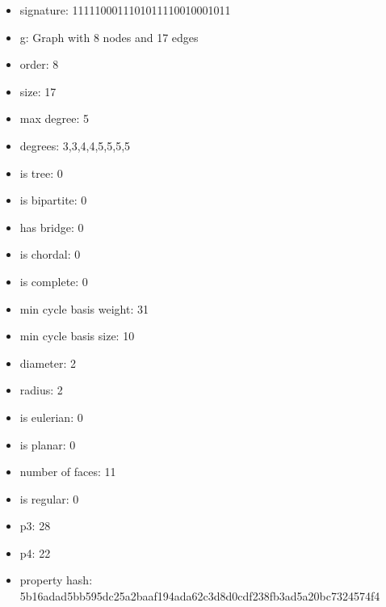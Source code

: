 \begin{itemize}
\item signature: 1111100011101011110010001011
\item g: Graph with 8 nodes and 17 edges
\item order: 8
\item size: 17
\item max degree: 5
\item degrees: 3,3,4,4,5,5,5,5
\item is tree: 0
\item is bipartite: 0
\item has bridge: 0
\item is chordal: 0
\item is complete: 0
\item min cycle basis weight: 31
\item min cycle basis size: 10
\item diameter: 2
\item radius: 2
\item is eulerian: 0
\item is planar: 0
\item number of faces: 11
\item is regular: 0
\item p3: 28
\item p4: 22
\item property hash: 5b16adad5bb595dc25a2baaf194ada62c3d8d0cdf238fb3ad5a20bc7324574f4
\end{itemize}
\newpage
\begin{figure}
\end{figure}
